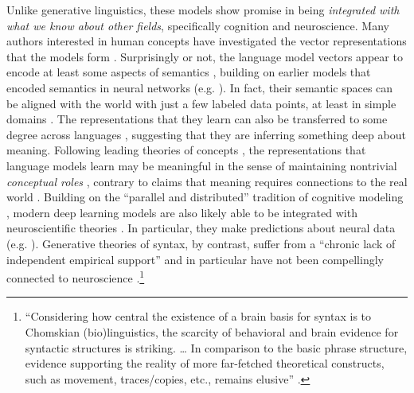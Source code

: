 \documentclass[output=paper,colorlinks,citecolor=brown]{langscibook}
\begin{document}
Unlike generative linguistics, these models show promise in being \textit{integrated with what we know about other fields}, specifically cognition and neuroscience. Many authors interested in human  concepts have investigated the vector representations that the models form \citep{lake2021word,bhatia2022transformer}. Surprisingly or not, the language model vectors appear to encode at least some aspects of semantics \citep{maas2011learning,socher2013recursive,bowman2015recursive,grand2022semantic,bhatia2022transformer,bhatia2022transformer,piantadosi2022meaning,dasgupta2022language,petersen2022lexical,pavlick2022semantic}, building on earlier models that encoded semantics in neural networks (e.g. \citealt{rogers2004semantic,elman2004alternative,mikolov2013distributed}). In fact, their semantic spaces can be aligned with the world with just a few labeled data points, at least in simple domains \citep{patel2022mapping}. The representations that they learn can also be transferred to some degree across languages \citep{pires2019multilingual,chi2020finding,gonen2020s,papadimitriou2020learning,papadimitriou2021deep,hill2017representational}, suggesting that they are inferring something deep about meaning. Following leading theories of concepts \citep{block1986advertisement,block1998conceptual}, the representations that language models learn may be meaningful in the sense of maintaining nontrivial \textit{conceptual roles} \citep{piantadosi2022meaning}, contrary to claims that meaning requires connections to the real world \citep{bender2020climbing}. Building on the ``parallel and distributed'' tradition of cognitive modeling \citep{mcclelland1986parallel}, modern deep learning models are also likely able to be integrated with neuroscientific theories \citep{marblestone2016toward,richards2019deep,kanwisher2023using,mcclelland2020placing}. In particular, they make predictions about neural data (e.g. \citealt{schrimpf2021neural,caucheteux2022deep,goldstein2022shared}). Generative theories of syntax, by contrast, suffer from a ``chronic lack of independent empirical support'' and in particular have not been compellingly connected to neuroscience \citep{edelman2019verbal}.\footnote{``Considering how central the existence of a brain basis for syntax is to Chomskian (bio)linguistics, the scarcity of behavioral and brain evidence for syntactic structures is striking.  \ldots{}  In comparison to the basic phrase structure, evidence supporting the reality of more far-fetched theoretical constructs, such as movement, traces/copies, etc., remains elusive'' \citep{edelman2019verbal}.}
\end{document}
